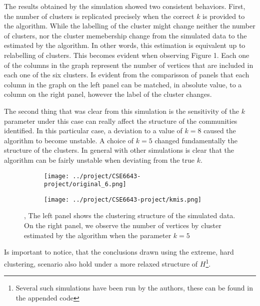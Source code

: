 \documentclass[11pt,letter]{article}%
\numberwithin{equation}{section}
\begin{document}
The results obtained by the simulation showed two consistent behaviors. First, the number of clusters is replicated precisely when the correct $k$ is provided to the algorithm. While the labelling of the cluster might change neither the number of clusters, nor the cluster memebership change from the simulated data to the estimated by the algorithm. In other words, this estimation is equivalent up to relabelling of clusters. This becomes evident when observing Figure 1. Each one of the columns in the graph represent the number of vertices that are included in each one of the six clusters. Is evident from the comparisson of panels that each column in the graph on the left panel can be matched, in absolute value, to a column on the right panel, however the label of the cluster changes.

The second thing that was clear from this simulation is the sensitivity of the $k$ parameter under this case can really affect the structure of the communities identified. In this particular case, a deviation to a value of $k=8$ caused the  algorithm to become unstable. A choice of $k=5$ changed fundamentally the structure of the clusters. In general with other simulations is clear that the algorithm can be fairly unstable when deviating from the true $k$. 



\begin{figure}[!h]
    \centering
    \begin{subfigure}[b]{0.45\textwidth}
            \centering
            \texttt{[image: ../project/CSE6643-project/original\_6.png]}
    \label{fig:fig1}
    \end{subfigure}
\begin{subfigure}[b]{0.45\textwidth}
            \centering
            \texttt{[image: ../project/CSE6643-project/kmis.png]}
    \label{fig:fig2}
    \end{subfigure}
    \caption{\protect{}, The left panel  shows the clustering structure of the simulated data. On the  right panel, \protect{} we observe the number of vertices by cluster estimated by the algorithm when the parameter $k=5$}
\end{figure}

Is important to notice, that the conclusions drawn using the extreme, hard clustering, scenario also hold under a more relaxed structure of $H$\footnote{Several such simulations have been run by the authors, these can be found in the appended code}.
\end{document}
